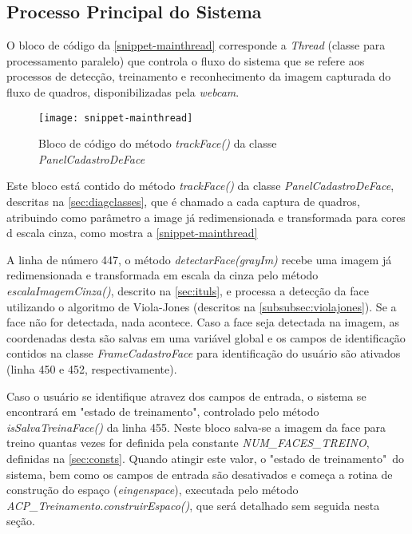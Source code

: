 \subsection{Processo Principal do Sistema}\label{sec:mainthread}

O bloco de código da \autoref{snippet-mainthread} corresponde a \textit{Thread} (classe para processamento paralelo) que controla o fluxo do sistema que se refere aos processos de detecção, treinamento e reconhecimento da imagem capturada do fluxo de quadros, disponibilizadas pela \textit{webcam}.

\begin{figure}[h]
	\centering
	\texttt{[image: snippet-mainthread]}
	\caption{Bloco de código do método \textit{trackFace()} da classe \textit{PanelCadastroDeFace}}
	\label{snippet-mainthread}
\end{figure}

Este bloco está contido do método \textit{trackFace()} da classe \textit{PanelCadastroDeFace}, descritas na \autoref{sec:diagclasses}, que é chamado a cada captura de quadros, atribuindo como parâmetro a image já redimensionada e transformada para cores d escala cinza, como mostra a  \autoref{snippet-mainthread}

A linha de número 447, o método \textit{detectarFace(grayIm)} recebe uma imagem já redimensionada e transformada em escala da cinza pelo método \textit{escalaImagemCinza()}, descrito na \autoref{sec:ituls}, e processa a detecção da face utilizando o algoritmo de Viola-Jones (descritos na \autoref{subsubsec:violajones}). Se a face não for detectada, nada acontece. Caso a face seja detectada na imagem, as coordenadas desta são salvas em uma variável global e os campos de identificação contidos na classe \textit{FrameCadastroFace} para identificação do usuário são ativados  (linha 450 e 452, respectivamente). 

Caso o usuário se identifique atravez dos campos de entrada, o sistema se encontrará em "estado de treinamento", controlado pelo método \textit{isSalvaTreinaFace()} da linha 455. Neste bloco salva-se a imagem da face para treino quantas vezes for definida pela constante \textit{NUM\_FACES\_TREINO}, definidas na \autoref{sec:consts}. Quando atingir este valor, o "estado de treinamento"\ do sistema, bem como os campos de entrada são desativados e começa a rotina de construção do espaço (\textit{eingenspace}), executada pelo método \textit{ACP\_Treinamento.construirEspaco()}, que será detalhado sem seguida nesta seção.

